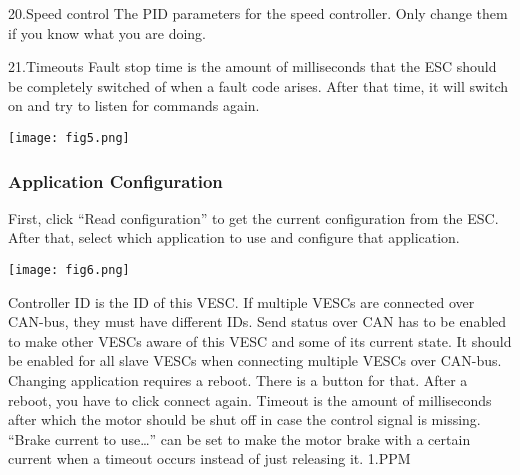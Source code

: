 \documentclass[11pt]{article}
\begin{document}
20.Speed control\newline
The PID parameters for the speed controller. Only change them if you know what you are doing.\newline

21.Timeouts\newline
Fault stop time is the amount of milliseconds that the ESC should be completely switched of when a fault code arises. After that time, it will switch on and try to listen for commands again.\newline
\begin {center}
\texttt{[image: fig5.png]}\newline

\end{center}

\subsubsection{ Application Configuration}
\label {Application Configuration}

First, click “Read configuration” to get the current configuration from the ESC. After that, select which application to use and configure that application.\newline
\begin {center}
\texttt{[image: fig6.png]}\newline

\end{center}
Controller ID is the ID of this VESC. If multiple VESCs are connected over CAN-bus, they must have different IDs\newline.
Send status over CAN has to be enabled to make other VESCs aware of this VESC and some of its current state. It should be enabled for all slave VESCs when connecting multiple VESCs over CAN-bus.\newline
Changing application requires a reboot. There is a button for that. After a reboot, you have to click connect again.\newline
Timeout is the amount of milliseconds after which the motor should be shut off in case the control signal is missing.\newline
“Brake current to use…” can be set to make the motor brake with a certain current when a timeout occurs instead of just releasing it.\newline
 1.PPM
\end{document}
